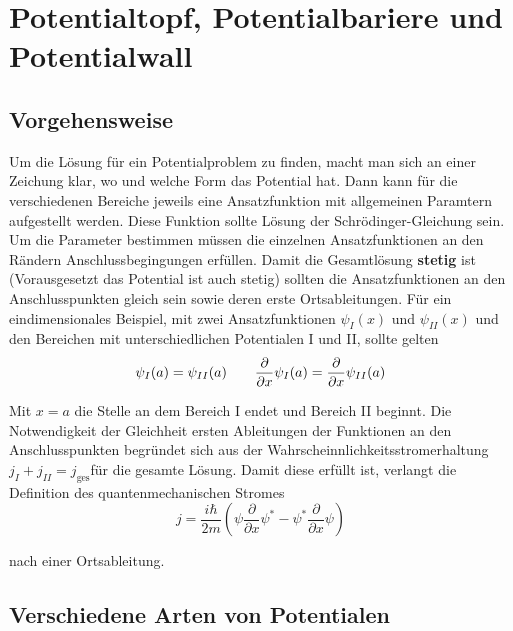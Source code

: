 
\graphicspath{{sgl_potential_pics/}}%


\setcounter{section}{1}
\section*{Potentialtopf, Potentialbariere und Potentialwall}

\subsection*{Vorgehensweise}

Um die Lösung für ein Potentialproblem zu finden, macht man sich an einer Zeichung klar, wo und welche Form das Potential hat. Dann kann für die verschiedenen Bereiche jeweils eine Ansatzfunktion mit allgemeinen Paramtern aufgestellt werden. Diese Funktion sollte Lösung der Schrödinger-Gleichung sein. Um die Parameter bestimmen müssen die einzelnen Ansatzfunktionen an den Rändern Anschlussbegingungen erfüllen. Damit die Gesamtlösung \textbf{stetig} ist (Vorausgesetzt das Potential ist auch stetig) sollten die Ansatzfunktionen an den Anschlusspunkten gleich sein sowie deren erste Ortsableitungen. Für ein eindimensionales Beispiel, mit zwei Ansatzfunktionen \(\psi_I(x)\) und \(\psi_{II}(x)\) und den Bereichen mit unterschiedlichen Potentialen I und II, sollte gelten
\begin{equation}
  \label{eq:15}
  \psi_I(a) = \psi_{II}(a)\qquad  \pdiff_x \psi_I(a) = \pdiff_x \psi_{II}(a)
\end{equation}

Mit \(x=a\) die Stelle an dem Bereich I endet und Bereich II beginnt. Die Notwendigkeit der Gleichheit ersten Ableitungen der Funktionen an den Anschlusspunkten begründet sich aus der Wahrscheinnlichkeitsstromerhaltung \(j_I+j_{II}=j_{\text{ges}}\)für die gesamte Lösung. Damit diese erfüllt ist, verlangt die Definition des quantenmechanischen Stromes
\begin{equation}
  \label{eq:17}
  j = \frac{i\hbar}{2m}\left(\psi \frac{\partial}{\partial x} \psi^* - \psi^* \frac{\partial}{\partial x}\psi\right)
\end{equation}

nach einer Ortsableitung.

\subsection*{Verschiedene Arten von Potentialen}

